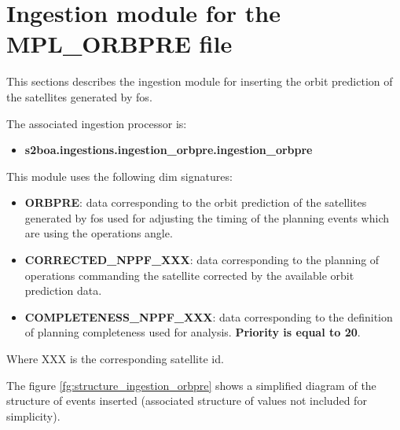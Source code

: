 \section{Ingestion module for the MPL\_ORBPRE file}

This sections describes the ingestion module for inserting the orbit prediction of the satellites generated by \acrshort{fos}.

The associated ingestion processor is:

\begin{itemize} 

\item \textbf{s2boa.ingestions.ingestion\_orbpre.ingestion\_orbpre}
  
\end{itemize}

This module uses the following \acrshort{dim} signatures:

\begin{itemize} 

\item \textbf{ORBPRE}: data corresponding to the orbit prediction of the satellites generated by \acrshort{fos} used for adjusting the timing of the planning events which are using the operations angle.

\item \textbf{CORRECTED\_NPPF\_XXX}: data corresponding to the planning of operations commanding the satellite corrected by the available orbit prediction data.

\item \textbf{COMPLETENESS\_NPPF\_XXX}: data corresponding to the definition of planning completeness used for analysis. \textbf{Priority is equal to 20}.
  
\end{itemize}

Where XXX is the corresponding satellite id.

The figure \ref{fg:structure_ingestion_orbpre} shows a simplified diagram of the structure of events inserted (associated structure of values not included for simplicity).

